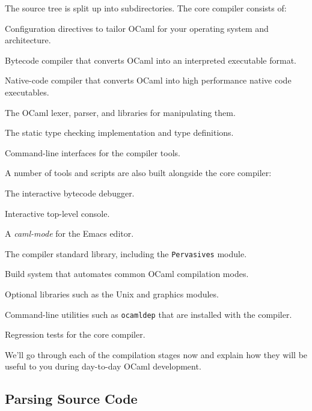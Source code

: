 The source tree is split up into subdirectories. The core compiler
consists of:

\begin{description}
\tightlist
\item[\texttt{config/}]
Configuration directives to tailor OCaml for your operating system and
architecture.
\item[\texttt{bytecomp/}]
Bytecode compiler that converts OCaml into an interpreted executable
format.
\item[\texttt{asmcomp/}]
Native-code compiler that converts OCaml into high performance native
code executables.
\item[\texttt{parsing/}]
The OCaml lexer, parser, and libraries for manipulating them.
\item[\texttt{typing/}]
The static type checking implementation and type definitions.
\item[\texttt{driver/}]
Command-line interfaces for the compiler tools.
\end{description}

A number of tools and scripts are also built alongside the core
compiler:

\begin{description}
\tightlist
\item[\texttt{debugger/}]
The interactive bytecode debugger.
\item[\texttt{toplevel/}]
Interactive top-level console.
\item[\texttt{emacs/}]
A \emph{caml-mode} for the Emacs editor.
\item[\texttt{stdlib/}]
The compiler standard library, including the
\passthrough{\lstinline!Pervasives!} module.
\item[\texttt{ocamlbuild/}]
Build system that automates common OCaml compilation modes.
\item[\texttt{otherlibs/}]
Optional libraries such as the Unix and graphics modules.
\item[\texttt{tools/}]
Command-line utilities such as \passthrough{\lstinline!ocamldep!} that
are installed with the compiler.
\item[\texttt{testsuite/}]
Regression tests for the core compiler.
\end{description}

We'll go through each of the compilation stages now and explain how they
will be useful to you during day-to-day OCaml development.

\hypertarget{parsing-source-code}{%
\subsection{Parsing Source Code}\label{parsing-source-code}}


